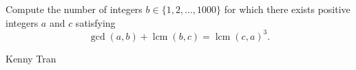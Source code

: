 Compute the number of integers $b \in \{1,2,\dots,1000\}$ for which there exists positive integers $a$ and $c$ satisfying \[ \gcd(a,b) + \operatorname{lcm}(b,c) = \operatorname{lcm}(c,a)^3. \]

Kenny Tran
